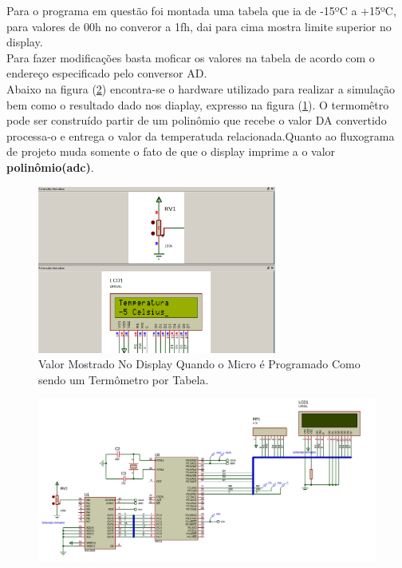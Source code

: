 \documentclass{Fabiano_file}
\begin{document}
{Para o programa em questão foi montada uma tabela que ia de -15ºC a +15ºC, para valores de 00h no converor a 1fh, dai para cima mostra limite superior no display.\\
Para fazer modificações basta moficar os valores na tabela de acordo com o endereço especificado pelo conversor AD.\\
Abaixo na figura (\ref{fig:hardware_termometro}) encontra-se o hardware utilizado para realizar a simulação bem como o resultado dado nos diaplay,
expresso na figura (\ref{fig:display_termometro_tabela}).
O termomêtro pode ser construído partir de um polinômio que recebe o valor DA convertido processa-o e entrega o valor da temperatuda relacionada.Quanto ao fluxograma 
de projeto muda somente o fato de que o display imprime a o valor \textbf{polinômio(adc)}.

\begin{figure}[h!]
\centering
\includegraphics[width=0.7\textwidth]{display_termometro_tabela.pdf}
\caption{Valor Mostrado No Display Quando o Micro é Programado Como sendo um Termômetro por Tabela.}
\label{fig:display_termometro_tabela}
\end{figure}
	
	\newpage
	\clearpage
	\begin{figure}
		\centering
		\includegraphics[width=1\linewidth]{hardware_termometro}
		\label{fig:hardware_termometro}
	\end{figure}
	\clearpage
	\newpage
	

}
\end{document}
